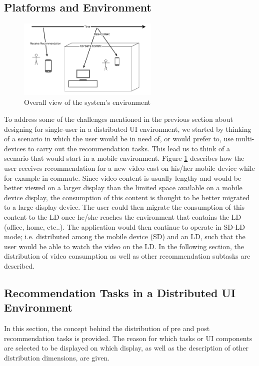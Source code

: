 \subsection{Platforms and Environment}
\begin{figure}[h!]
\includegraphics[width=0.6\textwidth, inner, center]{env}
\caption{Overall view of the system's environment}
\label{fig:figure311}
\end{figure}
To address some of the challenges mentioned in the previous section about designing for single-user in a distributed UI environment, we started by thinking of a scenario in which the user would be in need of, or would prefer to, use multi-devices to carry out the recommendation tasks. This lead us to think of a scenario that would start in a mobile environment. Figure \ref{fig:figure311} describes how the user receives recommendation for a new video cast on his/her mobile device while for example in commute. Since video content is usually lengthy and would be better viewed on a larger display than the limited space available on a mobile device display, the consumption of this content is thought to be better migrated to a large display device. The user could then migrate the consumption of this content to the LD once he/she reaches the environment that contains the LD (office, home, etc..). The application would then continue to operate in SD-LD mode; i.e. distributed among the mobile device (SD) and an LD, such that the user would be able to watch the video on the LD. In the following section, the distribution of video consumption as well as other recommendation subtasks are described.          
\subsection{Recommendation Tasks in a Distributed UI Environment}
In this section, the concept behind the distribution of pre and post recommendation tasks is provided. The reason for which tasks or UI components are selected to be displayed on which display, as well as the description of other distribution dimensions, are given.
